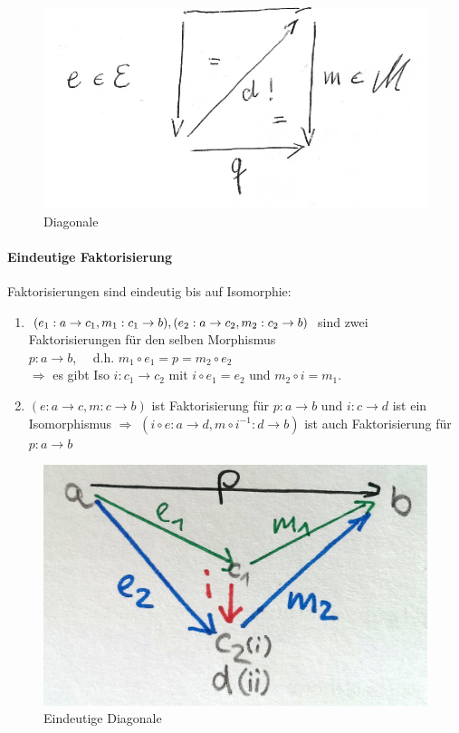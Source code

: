 \begin{figure}[h]
\label{fig:diagonale}
\noindent \centering{}\includegraphics[scale=0.5]{Abbildungen/Diagonal}\caption{Diagonale}
\end{figure}

\paragraph{ Eindeutige Faktorisierung}
Faktorisierungen sind eindeutig bis auf Isomorphie:

\begin{enumerate}
\item $(e_{1}:a\rightarrow c_{1},m_{1}:c_{1}\rightarrow b), \\ (e_{2}:a\rightarrow c_{2},m_{2}:c_{2}\rightarrow b)$ sind zwei Faktorisierungen für den selben Morphismus \\ $p:a\rightarrow b$,
\, \, d.h. $m_{1}\circ e_{1}=p=m_{2}\circ e_{2}$ \\
$\Rightarrow$ es gibt Iso $i:c_{1}\rightarrow c_{2}$ mit $i\circ e_{1}=e_{2}$
und $m_{2}\circ i=m_{1}$.
\item $(e:a\rightarrow c,m:c\rightarrow b)$
ist Faktorisierung für $p:a\rightarrow b$ und $i:c\rightarrow d$
ist ein Isomorphismus $\Rightarrow $ $(i\circ e:a\rightarrow d,m\circ i{}^{-1}:d\rightarrow b)$
ist auch Faktorisierung für $p:a\rightarrow b$
\end{enumerate}

\begin{figure}[h]
\label{fig:eindeutig_diagonale}
\noindent \centering{}\includegraphics[scale=0.1]{Abbildungen/eindeutig_diagonale}\caption{Eindeutige Diagonale}
\end{figure}


